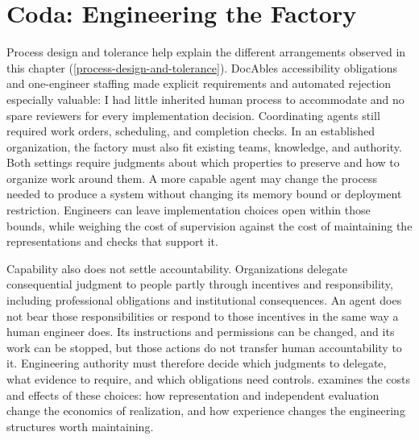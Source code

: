 



\chapter{Coda: Engineering the Factory}


Process design and tolerance help explain the different arrangements observed in this chapter (\autoref{process-design-and-tolerance}). DocAble\textquotesingle s accessibility obligations and one-engineer staffing made explicit requirements and automated rejection especially valuable: I had little inherited human process to accommodate and no spare reviewers for every implementation decision. Coordinating agents still required work orders, scheduling, and completion checks. In an established organization, the factory must also fit existing teams, knowledge, and authority. Both settings require judgments about which properties to preserve and how to organize work around them. A more capable agent may change the process needed to produce a system without changing its memory bound or deployment restriction. Engineers can leave implementation choices open within those bounds, while weighing the cost of supervision against the cost of maintaining the representations and checks that support it.


Capability also does not settle accountability. Organizations delegate consequential judgment to people partly through incentives and responsibility, including professional obligations and institutional consequences\citep{marchsimon1958}. An agent does not bear those responsibilities or respond to those incentives in the same way a human engineer does. Its instructions and permissions can be changed, and its work can be stopped, but those actions do not transfer human accountability to it. Engineering authority must therefore decide which judgments to delegate, what evidence to require, and which obligations need controls.  examines the costs and effects of these choices: how representation and independent evaluation change the economics of realization, and how experience changes the engineering structures worth maintaining.
